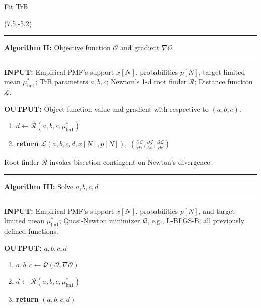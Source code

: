 \documentclass[aspectratio=169]{beamer}
\begin{document}
\begin{frame}{Fit TrB}
\begin{textblock}{7}
\begin{tiny}
\end{tiny}
\end{textblock}




\begin{textblock}{7}(7.5,-5.2)

\begin{tiny}

\rule{7cm}{0.4pt}\smallskip
		
		\textbf{Algorithm II:} Objective function $\mathcal{O}$ and gradient $\nabla\mathcal{O}$
		\rule{7cm}{0.4pt}
		
		\textbf{INPUT:} Empirical PMF's support $x[N]$, probabilities $p[N]$, target limited mean $\mu^*_{\text{lm1}}$; TrB parameters $a, b, c$; Newton's 1-d root finder $\mathcal{R}$; Distance function $\mathcal{L}$. \smallskip
		
		\textbf{OUTPUT:} Object function value and gradient with respective to $(a, b, c)$.\smallskip
		
\begin{enumerate}


\item $d\gets \mathcal{R}\left(a, b, c, \mu^*_{\text{lm1}}\right) $\smallskip

\item \textbf{return} $\mathcal{L}(a, b, c, d, x[N], p[N])$, $\left(\frac{\partial \mathcal{L}}{\partial a}, \frac{\partial \mathcal{L}}{\partial b}, \frac{\partial \mathcal{L}}{\partial c}\right)$

\end{enumerate}

Root finder $\mathcal{R}$ invokes bisection contingent on Newton's divergence.\medskip\pause



\rule{7cm}{0.4pt}\smallskip
		
		\textbf{Algorithm III:} Solve $a, b, c, d$
		\rule{7cm}{0.4pt}
		
		\textbf{INPUT:} Empirical PMF's support $x[N]$, probabilities $p[N]$, and target limited mean $\mu^*_{\text{lm1}}$; Quasi-Newton minimizer $\mathcal{Q}$, e.g., L-BFGS-B; all previously defined functions. \smallskip
		
		\textbf{OUTPUT:} $a, b, c, d$
		
\begin{enumerate}

\item $a, b, c \gets \mathcal{Q}(\mathcal{O}, \nabla\mathcal{O})$\smallskip

\item $d\gets \mathcal{R}\left(a, b, c, \mu^*_{\text{lm1}}\right) $\smallskip

\item \textbf{return} $(a,b,c,d)$

\end{enumerate}
  
\end{tiny}

\end{textblock}

\end{frame}
\end{document}
